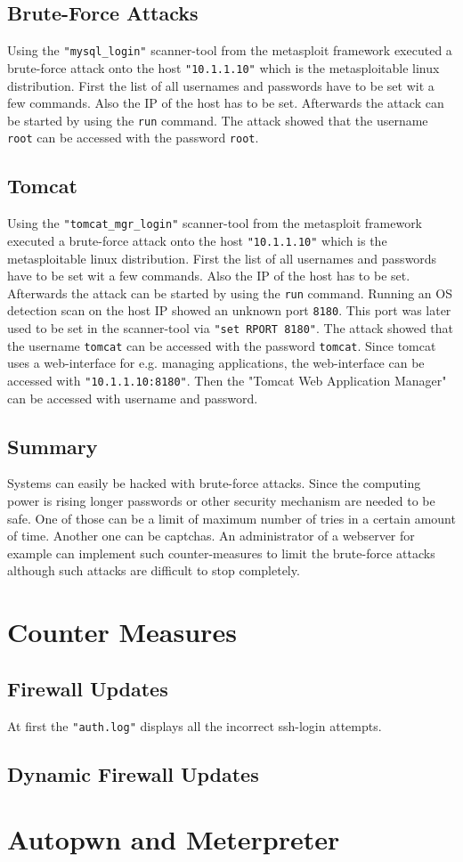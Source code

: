 \section{Brute-Force Attacks}

Using the \texttt{"mysql\_login"} scanner-tool from the metasploit framework executed a brute-force attack onto the host \texttt{"10.1.1.10"} which is the metasploitable linux distribution. First the list of all usernames and passwords have to be set wit a few commands. Also the \ac{IP} of the host has to be set. Afterwards the attack can be started by using the \texttt{run} command. The attack showed that the username \texttt{root} can be accessed with the password \texttt{root}.

\section{Tomcat}

Using the \texttt{"tomcat\_mgr\_login"} scanner-tool from the metasploit framework executed a brute-force attack onto the host \texttt{"10.1.1.10"} which is the metasploitable linux distribution. First the list of all usernames and passwords have to be set wit a few commands. Also the \ac{IP} of the host has to be set. Afterwards the attack can be started by using the \texttt{run} command. Running an OS detection scan on the host \ac{IP} showed an unknown port \texttt{8180}. This port was later used to be set in the scanner-tool via \texttt{"set RPORT 8180"}. The attack showed that the username \texttt{tomcat} can be accessed with the password \texttt{tomcat}. Since tomcat uses a web-interface for e.g. managing applications, the web-interface can be accessed with \texttt{"10.1.1.10:8180"}. Then the "Tomcat Web Application Manager" can be accessed with username and password.

\section{Summary}

Systems can easily be hacked with brute-force attacks. Since the computing power is rising longer passwords or other security mechanism are needed to be safe. One of those can be a limit of maximum number of tries in a certain amount of time. Another one can be captchas. An administrator of a webserver for example can implement such counter-measures to limit the brute-force attacks although such attacks are difficult to stop completely.

\chapter{Counter Measures}

\section{Firewall Updates}

At first the \texttt{"auth.log"} displays all the incorrect ssh-login attempts. 

\section{Dynamic Firewall Updates}

\chapter{Autopwn and Meterpreter}
